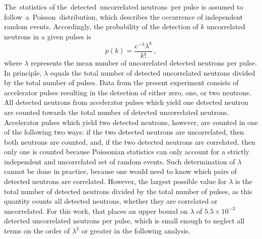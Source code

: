 The statistics of the detected uncorrelated neutrons per pulse is assumed to follow a Poisson distribution, which describes the occurrence of independent random events.
Accordingly, the probability of the detection of $k$ uncorrelated neutrons in a given pulses is
\begin{equation} \label{math:Pois}
p(k) = \frac{e^{-\lambda}\lambda^{k}}{k!} \, ,
\end{equation}
where $\lambda$ represents the mean number of uncorrelated detected neutrons per pulse.
In principle, $\lambda$ equals the total number of detected uncorrelated neutrons divided by the total number of pulses.
Data from the present experiment consists of accelerator pulses resulting in the detection of either zero, one, or two neutrons.
All detected neutrons from accelerator pulses which yield one detected neutron are counted towards the total number of detected uncorrelated neutrons.
Accelerator pulses which yield two detected neutrons, however, are counted in one of the following two ways: if the two detected neutrons are uncorrelated, then both neutrons are counted, and, if the two detected neutrons are correlated, then only one is counted because Poissonian statistics can only account for a strictly independent and uncorrelated set of random events.
Such determination of $\lambda$ cannot be done in practice, because one would need to know which pairs of detected neutrons are correlated.
However, the largest possible value for $\lambda$ is the total number of detected neutrons divided by the total number of pulses, as this quantity counts all detected neutrons, whether they are correlated or uncorrelated.
For this work, that places an upper bound on $\lambda$ of $5.5\times 10^{-3}$ detected uncorrelated neutrons per pulse, which is small enough to neglect all terms on the order of $\lambda^3$ or greater in the following analysis.


